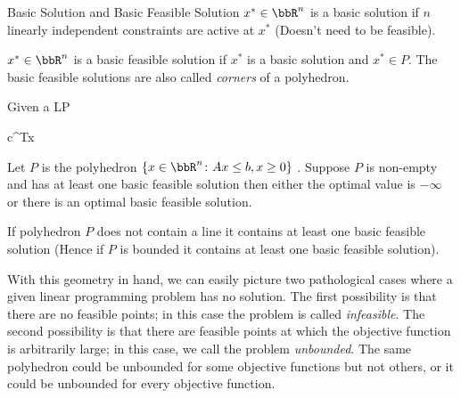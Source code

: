\begin{Definition}{Basic Solution and Basic Feasible Solution}{}
	$x^*\in \bbR^n$ is a basic solution if $n$ linearly independent constraints are active at $x^*$ (Doesn't need to  be feasible).\parinn
	
	$x^*\in\bbR^n$ is a basic feasible solution if $x^*$ is a basic solution and $x^*\in P$. The basic feasible solutions are also called \textit{corners} of a polyhedron.
\end{Definition}
\begin{Theorem}{}{}
	Given a LP 	\begin{mini*}
		{}{c^Tx}{}{}
	\end{mini*}Let $P$ is the polyhedron $\{x\in\bbR^n\colon Ax\leq b, x\geq0\}$ . Suppose $P$ is non-empty and has at least one basic feasible solution  then either the optimal value is $-\infty$ or there is an optimal basic feasible solution. 
\end{Theorem}

\begin{Theorem}{}{}
	If polyhedron $P$ does not contain a line it contains at least one basic feasible solution (Hence if $P$ is bounded it contains at least one basic feasible solution).
\end{Theorem}

With this geometry in hand, we can easily picture two pathological cases where a given linear programming problem has no solution. The first possibility is that there are no feasible points; in this case the problem is called \textit{infeasible}. The second possibility is that there are feasible points at which the objective function is arbitrarily large; in this case, we call the problem \textit{unbounded}. The same polyhedron could be unbounded for some objective functions but not others, or it could be unbounded for every objective function.

